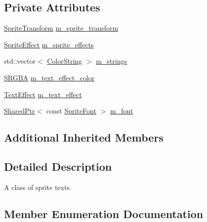 \subsection*{Private Attributes}
\begin{DoxyCompactItemize}
\item 
\hyperlink{classmage_1_1_sprite_transform}{Sprite\+Transform} \hyperlink{classmage_1_1_sprite_text_ade755cb73d8db4f388063cda1a351c50}{m\+\_\+sprite\+\_\+transform}
\item 
\hyperlink{namespacemage_ad62ebdf0e7aae0caf1535a4ea3f056ea}{Sprite\+Effect} \hyperlink{classmage_1_1_sprite_text_acc64029be6634cac0651ceaaa0f84a3b}{m\+\_\+sprite\+\_\+effects}
\item 
std\+::vector$<$ \hyperlink{classmage_1_1_color_string}{Color\+String} $>$ \hyperlink{classmage_1_1_sprite_text_aadda462c0b67282ef86a7cb2b235367c}{m\+\_\+strings}
\item 
\hyperlink{structmage_1_1_s_r_g_b_a}{S\+R\+G\+BA} \hyperlink{classmage_1_1_sprite_text_a82f53e64dc8cc9a9d23a1c26ee9fad9e}{m\+\_\+text\+\_\+effect\+\_\+color}
\item 
\hyperlink{classmage_1_1_sprite_text_a4d3101d037b6fe4247d77b5fbf811dd2}{Text\+Effect} \hyperlink{classmage_1_1_sprite_text_a4019b7510bba20a9b86460fd6c47698f}{m\+\_\+text\+\_\+effect}
\item 
\hyperlink{namespacemage_a1e01ae66713838a7a67d30e44c67703e}{Shared\+Ptr}$<$ const \hyperlink{classmage_1_1_sprite_font}{Sprite\+Font} $>$ \hyperlink{classmage_1_1_sprite_text_a7d5f122cd5a87e47786796e41dbf6b71}{m\+\_\+font}
\end{DoxyCompactItemize}
\subsection*{Additional Inherited Members}


\subsection{Detailed Description}
A class of sprite texts. 

\subsection{Member Enumeration Documentation}
\hypertarget{classmage_1_1_sprite_text_a4d3101d037b6fe4247d77b5fbf811dd2}{}\label{classmage_1_1_sprite_text_a4d3101d037b6fe4247d77b5fbf811dd2} 
